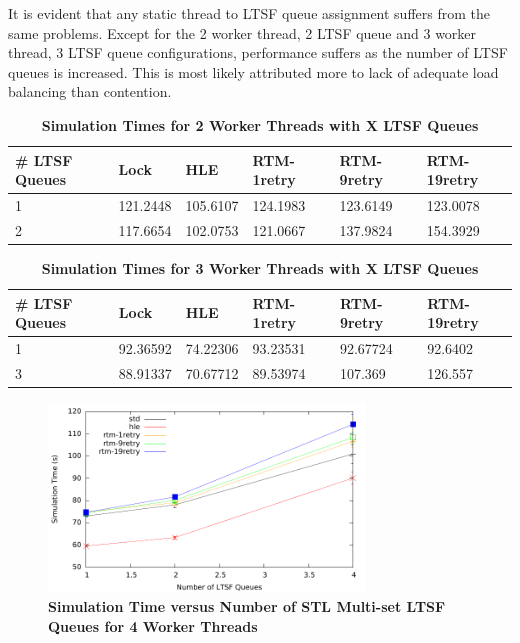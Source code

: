 \documentclass[11pt]{book}
\begin{document}
It is evident that any static thread to LTSF queue assignment suffers from the same
problems.  Except for the 2 worker thread, 2 LTSF queue and 3 worker thread, 3 LTSF queue
configurations, performance suffers as the number of LTSF queues is increased.  This is
most likely attributed more to lack of adequate load balancing than contention.

\begin{table}
    \centering
    \begin{tabular}{l|p{2cm}|p{2cm}|p{2cm}|p{2cm}|p{2cm}}
        \textbf{\# LTSF Queues}&Lock &HLE &RTM-1retry &RTM-9retry &RTM-19retry \\
        \hline
        \midrule
            1 &121.2448  &105.6107 &124.1983 &123.6149 &123.0078\\ 
            2 &117.6654  &102.0753 &121.0667 &137.9824 &154.3929\\
    \end{tabular}
    \caption{\textbf{Simulation Times for 2 Worker Threads with X LTSF
        Queues}}\label{tab:xThrMig_2threadsXschq} 
\end{table}

\begin{table}
    \centering
    \begin{tabular}{l|p{2cm}|p{2cm}|p{2cm}|p{2cm}|p{2cm}}
        \textbf{\# LTSF Queues}&Lock &HLE &RTM-1retry &RTM-9retry &RTM-19retry \\
        \hline
        \midrule
            1 &92.36592  &74.22306 &93.23531  &92.67724 &92.6402 \\ 
            3 &88.91337  &70.67712 &89.53974  &107.369  &126.557 \\
    \end{tabular}
    \caption{\textbf{Simulation Times for 3 Worker Threads with X LTSF
        Queues}}\label{tab:xThrMig_3threadsXschq} 
\end{table}

\begin{figure}
    \centering
    \graphicspath{ {./figures/} }
    \includegraphics[width=0.75\textwidth,keepaspectratio]{hugeepidemicsim-XEVENTmig-timeVSschedQs-multiset-4thread}
    \caption{\textbf{Simulation Time versus Number of STL Multi-set LTSF Queues for 4
        Worker Threads}}\label{fig:xThrMig_timeVSschq_4threads}
\end{figure}
\end{document}
